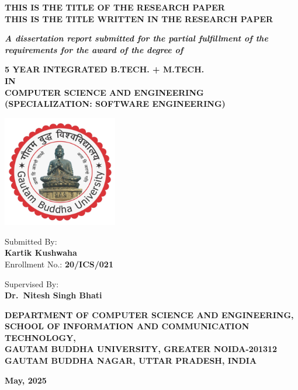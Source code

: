 \begin{titlepage}
	\begin{center}
		{\large\uppercase{
				\textbf{This is the title of the Research Paper\\
					This is the title written in the research paper}
			}}

		{\normalsize\textbf{
				\textit{A dissertation report submitted for the partial
					fulfillment of the requirements for the award of the degree of}
			}}

		\vspace{0.5cm} %

		\uppercase{\textbf{
				5 Year Integrated B.Tech. + M.Tech. \\
				In \\
				Computer Science And Engineering\\
				(Specialization: Software Engineering)
			}}

		\vspace{0.5cm} %

		\includegraphics[width=5cm]{figures/GBU_logo.png} %

		{\large{Submitted By:\\
				\textbf{Kartik Kushwaha}\\
				Enrollment No.:\textbf{ 20/ICS/021}}}

		\vspace{0.25cm} %

		{\large{Supervised By: \\
				\textbf{Dr.~Nitesh Singh Bhati}}}

		{\normalsize\uppercase{
				\textbf{Department Of Computer Science And Engineering, \\
					School Of Information And Communication Technology, \\
					Gautam Buddha University, Greater Noida-201312 \\
					Gautam Buddha Nagar, Uttar Pradesh, India}
			}}

		\vfill %

		{\large \textbf{May, 2025}}

	\end{center}
\end{titlepage}

